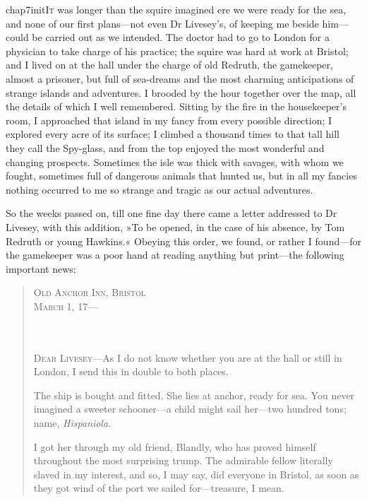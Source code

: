 
   \lettrine[lines=4,image=true]{chap7initI}{t} was longer than the squire imagined ere we were ready for the sea, and none of our first plans—not even Dr Livesey's, of keeping me beside him—could be carried out as we intended. The doctor had to go to London for a physician to take charge of his practice; the squire was hard at work at Bristol; and I lived on at the hall under the charge of old Redruth, the gamekeeper, almost a prisoner, but full of sea-dreams and the most charming anticipations of strange islands and adventures. I brooded by the hour together over the map, all the details of which I well remembered. Sitting by the fire in the housekeeper's room, I approached that island in my fancy from every possible direction; I explored every acre of its surface; I climbed a thousand times to that tall hill they call the Spy-glass, and from the top enjoyed the most wonderful and changing prospects. Sometimes the isle was thick with savages, with whom we fought, sometimes full of dangerous animals that hunted us, but in all my fancies nothing occurred to me so strange and tragic as our actual adventures.

So the weeks passed on, till one fine day there came a letter addressed to Dr Livesey, with this addition, »To be opened, in the case of his absence, by Tom Redruth or young Hawkins.« Obeying this order, we found, or rather I found—for the gamekeeper was a poor hand at reading anything but print—the following important news:

\begin{quotation}
\hfill\begin{minipage}{0.6\linewidth}\textsc{Old Anchor Inn, Bristol\\March 1, 17—}\end{minipage}\\
~\\
\nopagebreak
\textsc{Dear Livesey}—As I do not know whether you are at the hall or still in London, I send this in double to both places.

The ship is bought and fitted. She lies at anchor, ready for sea. You never imagined a sweeter schooner—a child might sail her—two hundred tons; name, \textit{Hispaniola}.

I got her through my old friend, Blandly, who has proved himself throughout the most surprising trump. The admirable fellow literally slaved in my interest, and so, I may say, did everyone in Bristol, as soon as they got wind of the port we sailed for—treasure, I mean.
\end{quotation}

